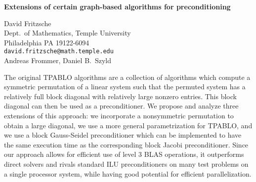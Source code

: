 \documentclass{report}
\begin{document}

\begin{center}
{\large
{\bf Extensions of certain graph-based algorithms for preconditioning}}

	David Fritzsche \\
	Dept.~of Mathematics, Temple University \\
	Philadelphia PA 19122-6094 \\
	{\tt david.fritzsche@math.temple.edu} \\
	Andreas Frommer, Daniel B.~Szyld
\end{center}
The original TPABLO algorithms are a collection of algorithms
which compute a symmetric permutation of a linear system such
that the permuted system has a relatively full block
diagonal with relatively large nonzero entries. This block
diagonal can then be used as a preconditioner.
We propose and analyze three extensions of this approach: we
incorporate a nonsymmetric
permutation to obtain a large diagonal, we use a more general
parametrization for TPABLO, and we
use a block Gauss-Seidel preconditioner which can be implemented
to have the same execution time
as the corresponding block Jacobi preconditioner. Since our
approach allows for efficient use of level 3
BLAS operations, it outperforms direct solvers and rivals
standard ILU preconditioners on many test
problems on a single processor system, while having good
potential for efficient parallelization.


\end{document}
